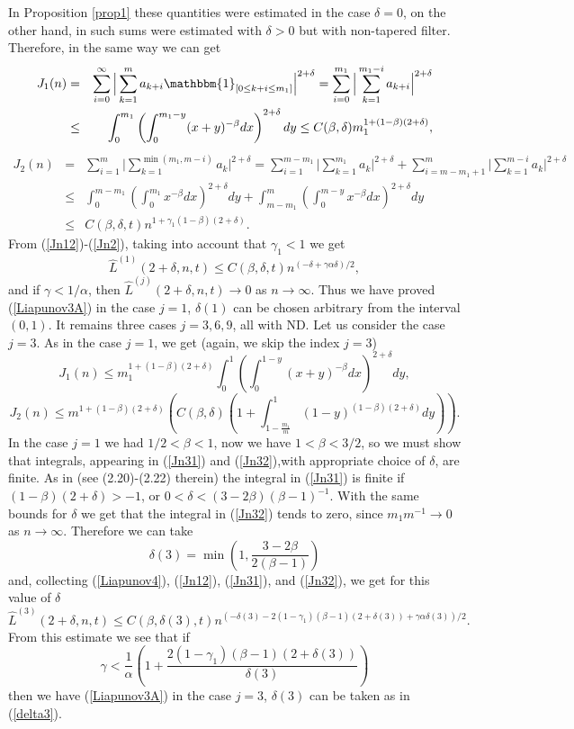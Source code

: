 \documentclass[12pt]{article}
\def\a{\alpha}
\def\b{\beta}
\def\d{\delta}
\def\g{\gamma}
\newcommand{\ind}[1]{\mathbbm{1}_{#1}}
\theoremstyle{plain}
\theoremstyle{definition}
\begin{document}
In Proposition \ref{prop1} these quantities were estimated in the case $\d=0$, on the other hand, in \cite{Paul22} such sums were estimated with $\d>0$ but with non-tapered filter. Therefore, in the same way we can get
\begin{eqnarray}\label{Jn1}
J_1(n) &=& \sum_{i=0}^\infty \Big | \sum_{k=1}^m a_{k+i}\ind{[0\le k+i\le m_1]} \Big |^{2+\d}=\sum_{i=0}^{m_1} \Big | \sum_{k=1}^{m_1-i} a_{k+i} \Big |^{2+\d} \nonumber \\
       & \le & \int_0^{m_1}\left (\int_0^{m_1-y}(x+y)^{-\b} dx\right )^{2+\d} dy \le C(\b, \d)m_1^{1+(1-\b)(2+\d)},
\end{eqnarray}
\begin{eqnarray}\label{Jn2}
J_2(n) &=& \sum_{i=1}^m \Big | \sum_{k=1}^{\min(m_1, m-i)} a_{k} \Big |^{2+\d}=\sum_{i=1}^{m-m_1} \Big | \sum_{k=1}^{m_1} a_{k} \Big |^{2+\d} +\sum_{i=m-m_1+1}^m \Big | \sum_{k=1}^{ m-i} a_{k} \Big |^{2+\d}  \nonumber \\
       & \le & \int_0^{m-m_1}\left (\int_0^{m_1}x^{-\b} dx\right )^{2+\d} dy + \int_{m-m_1}^m\left (\int_0^{m-y}x^{-\b} dx\right )^{2+\d} dy  \nonumber \\
       & \le & C(\b, \d, t)n^{1+\g_1(1-\b)(2+\d)}.
\end{eqnarray}
From (\ref{Jn12})-(\ref{Jn2}), taking into account that $\g_1<1$ we get
$$
{\hat L}^{(1)}(2+\d,n, t)\le C(\b, \d, t)n^{(-\d+\g\a\d)/2},
$$
and if $\g<1/\a$, then ${\hat L}^{(j)}(2+\d,n, t) \to 0$ as $n\to \infty.$ Thus we have proved (\ref{Liapunov3A}) in the case $j=1$, $\d(1)$ can be chosen arbitrary from the interval $(0, 1)$.
It remains three cases $j=3, 6, 9$, all with ND. Let us consider the case $j=3.$ As in the case $j=1$, we get (again, we skip the index $j=3$)
\begin{equation}\label{Jn31}
J_1(n)   \le m_1^{1+(1-\b)(2+\d)}\int_0^{1}\left (\int_0^{1-y}(x+y)^{-\b} dx\right )^{2+\d} dy,
\end{equation}
\begin{equation}\label{Jn32}
J_2(n)   \le m^{1+(1-\b)(2+\d)}\left ( C(\b, \d)(1+\int_{1-\frac{m_1}{m}}^{1}(1-y)^{(1-\b)(2+\d)}  dy)\right ).
\end{equation}
In the case $j=1$ we had $1/2<\b<1$, now we have $1<\b<3/2$, so we must show that integrals, appearing in (\ref{Jn31}) and (\ref{Jn32}),with appropriate choice of $\d$, are finite. As in \cite{Paul22} (see (2.20)-(2.22) therein) the integral in (\ref{Jn31}) is finite if $(1-\b)(2+\d)>-1$, or $0<\d<(3-2\b)(\b-1)^{-1}$. With the same bounds for $\d$ we get that the integral in (\ref{Jn32}) tends to zero, since $m_1m^{-1} \to 0$ as $n\to \infty.$ Therefore we can take
\begin{equation}\label{delta3}
\d(3)=\min \left (1, \frac{3-2\b}{2(\b-1)}\right )
\end{equation}
and, collecting (\ref{Liapunov4}), (\ref{Jn12}), (\ref{Jn31}), and (\ref{Jn32}), we get for this value of $\d$
$$
{\hat L}^{(3)}(2+\d,n, t)\le C(\b, \d(3), t)n^{(-\d(3)-2(1-\g_1)(\b-1)(2+\d(3)) +\g\a\d(3))/2}.
$$
From this estimate we see that if
$$
\g<\frac{1}{\a}\left (1+\frac{2(1-\g_1)(\b-1)(2+\d(3))}{\d(3)} \right )
$$
then we have (\ref{Liapunov3A}) in the case $j=3$, $\d(3)$ can be taken as in (\ref{delta3}).
\end{document}
